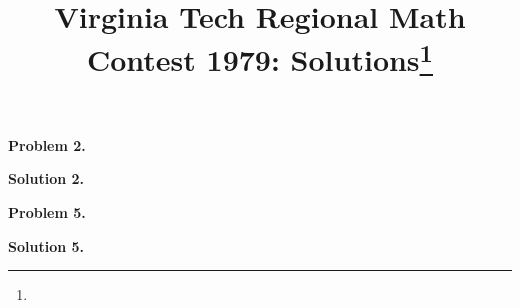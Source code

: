 \documentclass[10pt]{article}
\newcommand{\problem}[1]{\textbf{Problem #1.}}
\newcommand{\solution}[1]{\textbf{Solution #1.}}
\newcommand{\inputproblem}[2]{}
\begin{document}
\title{Virginia Tech Regional Math Contest 1979: Solutions\footnote{\disclaimer}}
\author{\vspace{-2ex}}
\date{\vspace{-5ex}} %
\maketitle

% 

\problem{2}
\inputproblem{1979}{2}

\solution{2}


% 

% 

\problem{5}
\inputproblem{1979}{5}

\solution{5}


% 

% 

% 
\end{document}
